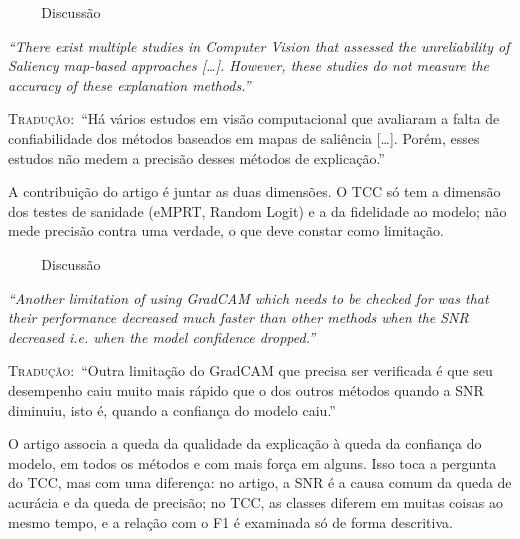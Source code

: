 \documentclass[11pt,a4paper]{article}
\newcommand{\pagechip}[1]{{\setlength{\fboxsep}{1.5pt}\colorbox{cAcc}{\textcolor{white}{\scriptsize\texttt{#1}}}}}
\newenvironment{origquote}{\par\itshape\small}{\par}
\newenvironment{tradquote}{\par\small\textsc{Tradução:}\ }{\par}
\newcommand{\explab}[1]{\par\smallskip{\small\color{cAcc}\textbf{\MakeUppercase{#1}}}\par}
\begin{document}
\begin{citacard}{\pagechip{p. 7} Discussão}
\begin{origquote}“There exist multiple studies in Computer Vision that assessed the unreliability of Saliency map-based approaches [\ldots]. However, these studies do not measure the accuracy of these explanation methods.”\end{origquote}
\begin{tradquote}“Há vários estudos em visão computacional que avaliaram a falta de confiabilidade dos métodos baseados em mapas de saliência [\ldots]. Porém, esses estudos não medem a precisão desses métodos de explicação.”\end{tradquote}
\explab{Explicação}
A contribuição do artigo é juntar as duas dimensões. O TCC só tem a dimensão dos testes de sanidade (eMPRT, Random Logit) e a da fidelidade ao modelo; não mede precisão contra uma verdade, o que deve constar como limitação.
\end{citacard}

\begin{citacard}{\pagechip{p. 8} Discussão}
\begin{origquote}“Another limitation of using GradCAM which needs to be checked for was that their performance decreased much faster than other methods when the SNR decreased i.e. when the model confidence dropped.”\end{origquote}
\begin{tradquote}“Outra limitação do GradCAM que precisa ser verificada é que seu desempenho caiu muito mais rápido que o dos outros métodos quando a SNR diminuiu, isto é, quando a confiança do modelo caiu.”\end{tradquote}
\explab{Explicação}
O artigo associa a queda da qualidade da explicação à queda da confiança do modelo, em todos os métodos e com mais força em alguns. Isso toca a pergunta do TCC, mas com uma diferença: no artigo, a SNR é a causa comum da queda de acurácia e da queda de precisão; no TCC, as classes diferem em muitas coisas ao mesmo tempo, e a relação com o F1 é examinada só de forma descritiva.
\end{citacard}
\end{document}

